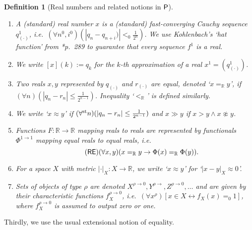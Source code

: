 \documentclass[reqno]{amsart}
\newtheorem{defi}[thm]{Definition}
\newcommand\be{\begin{equation}}
\newcommand\ee{\end{equation}}
\def\P{\textup{\textsf{P}}}
\def\N{{\mathbb  N}}
\def\Q{{\mathbb  Q}}
\def\R{{\mathbb  R}}
\def\R{{\mathbb{R}}}
\def\st{\textup{st}}
\def\asa{\leftrightarrow}
\def\di{\rightarrow}
\numberwithin{equation}{section}
\numberwithin{thm}{section}
\begin{document}
\begin{defi}[Real numbers and related notions in $\P$]\label{keepintireal}\rm~
\begin{enumerate}
\item A (standard) real number $x$ is a (standard) fast-converging Cauchy sequence $q_{(\cdot)}^{1}$, i.e.\ $(\forall n^{0}, i^{0})(|q_{n}-q_{n+i})|<_{0} \frac{1}{2^{n}})$.  
We use Kohlenbach's `hat function' from \cite{kohlenbach2}*{p.\ 289} to guarantee that every sequence $f^{1}$ is a real.  
\item We write $[x](k):=q_{k}$ for the $k$-th approximation of a real $x^{1}=(q^{1}_{(\cdot)})$.    
\item Two reals $x, y$ represented by $q_{(\cdot)}$ and $r_{(\cdot)}$ are \emph{equal}, denoted `$x=_{\R}y$', if $(\forall n)(|q_{n}-r_{n}|\leq \frac{1}{2^{n-1}})$. Inequality `$<_{\R}$' is defined similarly.         
\item We  write `$x\approx y$' if $(\forall^{\st} n)(|q_{n}-r_{n}|\leq \frac{1}{2^{n-1}})$ and $x\gg y$ if $x>y\wedge x\not\approx y$.  
\item Functions $F:\R\di \R$ mapping reals to reals are represented by functionals $\Phi^{1\di 1}$ mapping equal reals to equal reals, i.e. 
\be\tag{\textsf{RE}}\label{furg}
(\forall x, y)(x=_{\R}y\di \Phi(x)=_{\R}\Phi(y)).
\ee
 \item For a space $X$ with metric $|\cdot|_{X}:X\di \R$, we write `$x\approx y$' for `$|x-y|_{X}\approx 0$'.    
\item Sets of objects of type $\rho$ are denoted $X^{\rho\di 0}, Y^{\rho\di }, Z^{\rho\di 0}, \dots$ and are given by their characteristic functions $f^{\rho\di 0}_{X}$, i.e.\ $(\forall x^{\rho})[x\in X\asa f_{X}(x)=_{0}1]$, where $f_{X}^{\rho\di 0}$ is assumed to output zero or one.  
\end{enumerate}
\end{defi}
%
%
Thirdly, we use the usual extensional notion of equality. 
\end{document}
